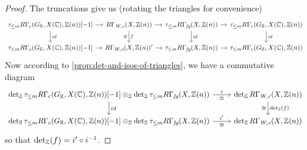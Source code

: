 \documentclass{article}
\numberwithin{equation}{section}
\begin{document}
\begin{lemma}
\begin{proof}
    The truncations give us (rotating the triangles for convenience)
    \[ \begin{tikzcd}[column sep=1em]
        \tau_{\le m} R\Gamma_c (G_\RR, X (\CC), \ZZ (n))[-1] \ar{r}\ar{d}{id} & R\Gamma_\Wc (X, \ZZ (n))\ar{d}{f}[swap]{\cong}\ar{r} & \tau_{\le m} R\Gamma_\fg (X,\ZZ(n)) \ar{d}{id}\ar{r} & \tau_{\le m} R\Gamma_c (G_\RR, X (\CC), \ZZ (n)) \ar{d}{id} \\
        \tau_{\le m} R\Gamma_c (G_\RR, X (\CC), \ZZ (n))[-1] \ar{r} & R\Gamma_\Wc (X, \ZZ (n))' \ar{r} & \tau_{\le m} R\Gamma_\fg (X,\ZZ(n)) \ar{r} & \tau_{\le m} R\Gamma_c (G_\RR, X (\CC), \ZZ (n))
      \end{tikzcd} \]
    Now according to \ref{prop:det-and-isos-of-triangles}, we have a commutative
    diagram
    \[ \begin{tikzcd}
        \det_\ZZ \tau_{\le m} R\Gamma_c (G_\RR, X (\CC), \ZZ (n))[-1] \otimes_\ZZ \det_\ZZ \tau_{\le m} R\Gamma_\fg (X,\ZZ(n)) \ar{r}{i}[swap]{\cong} \ar{d}{id} & \det_\ZZ R\Gamma_\Wc (X,\ZZ(n)) \ar{d}{\det_\ZZ (f)}[swap]{\cong} \\
        \det_\ZZ \tau_{\le m} R\Gamma_c (G_\RR, X (\CC), \ZZ (n))[-1] \otimes_\ZZ \det_\ZZ \tau_{\le m} R\Gamma_\fg (X, \ZZ (n)) \ar{r}{i'}[swap]{\cong} & \det_\ZZ R\Gamma_\Wc (X,\ZZ(n))
      \end{tikzcd} \]
    so that $\operatorname{det}_{\mathbb{Z}} (f) = i'\circ i^{-1}$.
  \end{proof}
\end{lemma}
\end{document}

